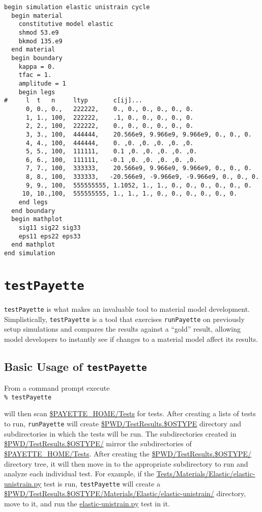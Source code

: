 \documentclass[11pt]{article}
\newcommand{\payette}{{\sc{Payette}}}
\newcommand{\runPayette}{{\texttt{runPayette}}}
\newcommand{\testPayette}{{\texttt{testPayette}}}
\newcommand{\termcommand}[1]{\indent\hspace{.2in}\texttt{\% #1}\newline}
\begin{document}
\begin{verbatim}
begin simulation elastic unistrain cycle
  begin material
    constitutive model elastic
    shmod 53.e9
    bkmod 135.e9
  end material
  begin boundary
    kappa = 0.
    tfac = 1.
    amplitude = 1
    begin legs
#     l  t   n     ltyp       c[ij]...
      0, 0., 0.,   222222,    0., 0., 0., 0., 0., 0.
      1, 1., 100,  222222,    .1, 0., 0., 0., 0., 0.
      2, 2., 100,  222222,    0., 0., 0., 0., 0., 0.
      3, 3., 100,  444444,    20.566e9, 9.966e9, 9.966e9, 0., 0., 0.
      4, 4., 100,  444444,    0. ,0. ,0. ,0. ,0. ,0.
      5, 5., 100,  111111,    0.1 ,0. ,0. ,0. ,0. ,0.
      6, 6., 100,  111111,   -0.1 ,0. ,0. ,0. ,0. ,0.
      7, 7., 100,  333333,    20.566e9, 9.966e9, 9.966e9, 0., 0., 0.
      8, 8., 100,  333333,   -20.566e9, -9.966e9, -9.966e9, 0., 0., 0.
      9, 9., 100,  555555555, 1.1052, 1., 1., 0., 0., 0., 0., 0., 0.
     10, 10.,100,  555555555, 1., 1., 1., 0., 0., 0., 0., 0., 0.
    end legs
  end boundary
  begin mathplot
    sig11 sig22 sig33
    eps11 eps22 eps33
  end mathplot
end simulation
\end{verbatim}

\clearpage
\section{\testPayette{}}
\testPayette{} is what makes \payette{} an invaluable tool to material model
development. Simplistically, \testPayette{} is a tool that exercises
\runPayette{} on previously setup simulations and compares the results against a
``gold'' result, allowing model developers to instantly see if changes to a
material model affect its results.

\subsection{Basic Usage of \testPayette{}}
From a command prompt execute\\

\termcommand{testPayette}

\noindent \testPayette{} will then scan \url{$PAYETTE_HOME/Tests} for tests.
After creating a lists of tests to run, \runPayette{} will create
\url{$PWD/TestResults.$OSTYPE} directory and subdirectories in which the tests
will be run. The subdirectories created in \url{$PWD/TestResults.$OSTYPE/} mirror
the subdirectories of \url{$PAYETTE_HOME/Tests}. After creating the
\url{$PWD/TestResults.$OSTYPE/} directory tree, it will then move in to the
appropriate subdirectory to run and analyze each individual test. For example, if
the \url{Tests/Materials/Elastic/elastic-unistrain.py} test is run,
\testPayette{} will create a
\url{$PWD/TestResults.$OSTYPE/Materials/Elastic/elastic-unistrain/} directory,
move to it, and run the \url{elastic-unistrain.py} test in it.
\end{document}
